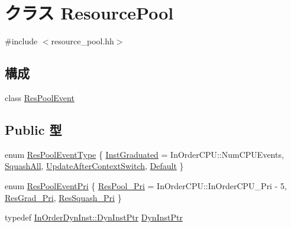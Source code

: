 \hypertarget{classResourcePool}{
\section{クラス ResourcePool}
\label{classResourcePool}
}


{\ttfamily \#include $<$resource\_\-pool.hh$>$}\subsection*{構成}
\begin{DoxyCompactItemize}
\item 
class \hyperlink{classResourcePool_1_1ResPoolEvent}{ResPoolEvent}
\end{DoxyCompactItemize}
\subsection*{Public 型}
\begin{DoxyCompactItemize}
\item 
enum \hyperlink{classResourcePool_a35de859343d36cfc41403577ea3c7de5}{ResPoolEventType} \{ \hyperlink{classResourcePool_a35de859343d36cfc41403577ea3c7de5a060f6b48fe7261f8f20bdcd8debb0c3f}{InstGraduated} =  InOrderCPU::NumCPUEvents, 
\hyperlink{classResourcePool_a35de859343d36cfc41403577ea3c7de5af0747b9517d1d94424ee2430a3d7c44c}{SquashAll}, 
\hyperlink{classResourcePool_a35de859343d36cfc41403577ea3c7de5a86a572ebd39e3afa528248332156c260}{UpdateAfterContextSwitch}, 
\hyperlink{classResourcePool_a35de859343d36cfc41403577ea3c7de5a79935518a3889663d8688b6b01fff051}{Default}
 \}
\item 
enum \hyperlink{classResourcePool_af5077bc20d438add09f07eaf0793f2ac}{ResPoolEventPri} \{ \hyperlink{classResourcePool_af5077bc20d438add09f07eaf0793f2aca4c94c0279b1acc3c2327607fb1acb5ed}{ResPool\_\-Pri} =  InOrderCPU::InOrderCPU\_\-Pri -\/ 5, 
\hyperlink{classResourcePool_af5077bc20d438add09f07eaf0793f2acad56c75651d73b496dd9d12336a0d89ae}{ResGrad\_\-Pri}, 
\hyperlink{classResourcePool_af5077bc20d438add09f07eaf0793f2aca43614fac58ab1f33158827533ea8bb8a}{ResSquash\_\-Pri}
 \}
\item 
typedef \hyperlink{classRefCountingPtr}{InOrderDynInst::DynInstPtr} \hyperlink{classResourcePool_a32d1573770d3d1d96a1741ac80433e33}{DynInstPtr}
\end{DoxyCompactItemize}
